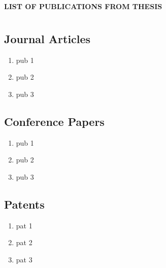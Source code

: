 
\thispagestyle{empty}


\vspace{-4cm}

\begin{center}
 {\large\bf LIST OF PUBLICATIONS FROM THESIS}
\end{center}


\section*{}

\subsection*{Journal Articles}

\begin{enumerate}
	\item pub 1
	
	\item pub 2
	
	\item pub 3
	
\end{enumerate}



\subsection*{Conference Papers}

\begin{enumerate}
	\item pub 1
	
	\item pub 2
	
	\item pub 3
\end{enumerate}


\subsection*{Patents}

\begin{enumerate}
	\item pat 1
	
	\item pat 2
	
	\item pat 3
\end{enumerate}